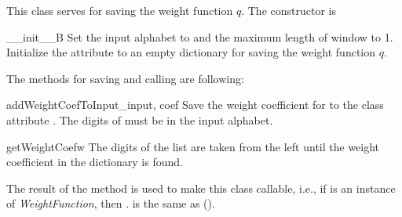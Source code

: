 This class serves for saving the weight function $q$. The constructor is

\begin{method}{\_\_init\_\_}{B}
Set the input alphabet to  and the maximum length of window to 1. Initialize the attribute  to an empty dictionary for saving the weight function $q$. 
\end{method}

The methods for saving and calling are following:

\begin{method}{addWeightCoefToInput}{\_input, coef}
Save the weight coefficient  for  to the class attribute . The digits of  must be in the input alphabet.
\end{method}

\begin{method}{getWeightCoef}{w}
The digits of the list  are taken from the left until the weight coefficient in the dictionary  is found. 
\end{method}

The result of the method  is used to make this class callable, i.e., if  is an instance of \emph{WeightFunction}, then . is the same as ().




